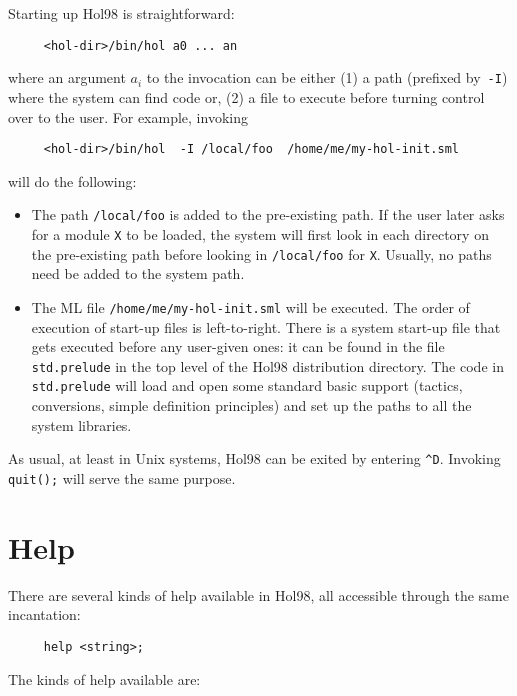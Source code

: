 \documentclass[12pt,fleqn,a4paper]{report}
\begin{document}
 Starting up Hol98 is straightforward:
 \begin{verbatim}
     <hol-dir>/bin/hol a0 ... an
 \end{verbatim}
 where an argument $a_i$ to the invocation can be either (1) a path
 (prefixed by~\verb+-I+) where the system can find code or, (2) a file to
 execute before turning control over to the user. For example, invoking
 \begin{verbatim}
     <hol-dir>/bin/hol  -I /local/foo  /home/me/my-hol-init.sml
 \end{verbatim}
 will do the following:
 \begin{itemize}
 \item The path \verb+/local/foo+ is added to the pre-existing path. If
    the user later asks for a module \verb+X+ to be loaded, the system
    will first look in each directory on the pre-existing path before
    looking in \verb+/local/foo+ for \verb+X+. Usually, no paths need be
    added to the system path.

  \item The ML file \verb+/home/me/my-hol-init.sml+ will be executed.
    The order of execution of start-up files is left-to-right. There
    is a system start-up file that gets executed before any user-given
    ones: it can be found in the file \verb+std.prelude+ in the top
    level of the Hol98 distribution directory. The code in
    \verb+std.prelude+ will load and open some standard basic support
    (tactics, conversions, simple definition principles) and set up
    the paths to all the system libraries.
 \end{itemize}

 As usual, at least in Unix systems, Hol98 can be exited by entering
 \verb+^D+. Invoking \verb+quit();+ will serve the same purpose.

\section{Help}
 There are several kinds of help available in Hol98, all accessible
 through the same incantation:
 \begin{verbatim}
     help <string>;
 \end{verbatim}

 The kinds of help available are:
\end{document}
